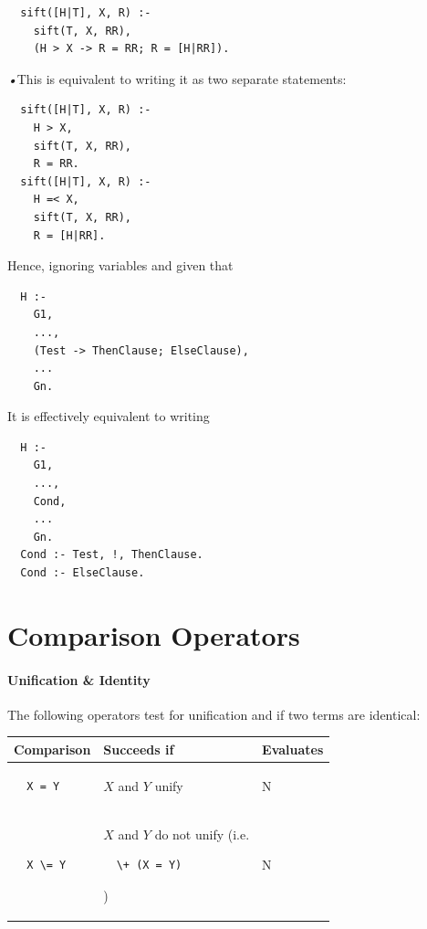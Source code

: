 \documentclass{article}
\begin{document}
\begin{multicols}{2}
  \begin{lstlisting}
  sift([H|T], X, R) :-
    sift(T, X, RR),
    (H > X -> R = RR; R = [H|RR]).
  \end{lstlisting}
  
  \noindent \emph{•}This is equivalent to writing it as two separate statements:
  
  \begin{lstlisting}
  sift([H|T], X, R) :-
    H > X,
    sift(T, X, RR),
    R = RR.
  sift([H|T], X, R) :-
    H =< X,
    sift(T, X, RR),
    R = [H|RR].
  \end{lstlisting}
  
  Hence, ignoring variables and given that
  
  \begin{lstlisting}
  H :-
    G1,
    ...,
    (Test -> ThenClause; ElseClause),
    ...
    Gn.
  \end{lstlisting}
  
  \noindent It is effectively equivalent to writing
  
  \begin{lstlisting}
  H :-
    G1,
    ...,
    Cond,
    ...
    Gn.
  Cond :- Test, !, ThenClause.
  Cond :- ElseClause.
  \end{lstlisting}
  
  \section{Comparison Operators}
  
  \paragraph{Unification \& Identity} The following operators test for unification and if two terms are identical:
  
  \noindent \begin{tabular}{ | p{2cm} | p{4cm} | p{1.4cm} | }
  \hline
  \bf Comparison & \bf Succeeds if & \bf Evaluates \\
  \hline
  
  \begin{lstlisting}
  X = Y
  \end{lstlisting} & $X$ and $Y$ unify & N \\
  \hline  
  
  \begin{lstlisting}
  X \= Y
  \end{lstlisting} & $X$ and $Y$ do not unify (i.e. 
  \begin{lstlisting}
  \+ (X = Y)
  \end{lstlisting}) & N \\
  \hline
  

\end{tabular}
\end{multicols}
\end{document}
